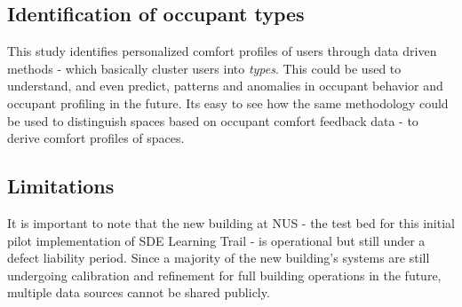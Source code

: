 \subsection{Identification of occupant types}

This study identifies personalized comfort profiles of users through data driven methods - which basically cluster users into \emph{types}. This could be used to understand, and even predict, patterns and anomalies in occupant behavior and occupant profiling in the future. Its easy to see how the same methodology could be used to distinguish spaces based on occupant comfort feedback data - to derive comfort profiles of spaces.


\subsection{Limitations}
It is important to note that the new building at NUS - the test bed for this initial pilot implementation of SDE Learning Trail - is operational but still under a defect liability period. Since a majority of the new building's systems are still undergoing calibration and refinement for full building operations in the future, multiple data sources cannot be shared publicly.  









